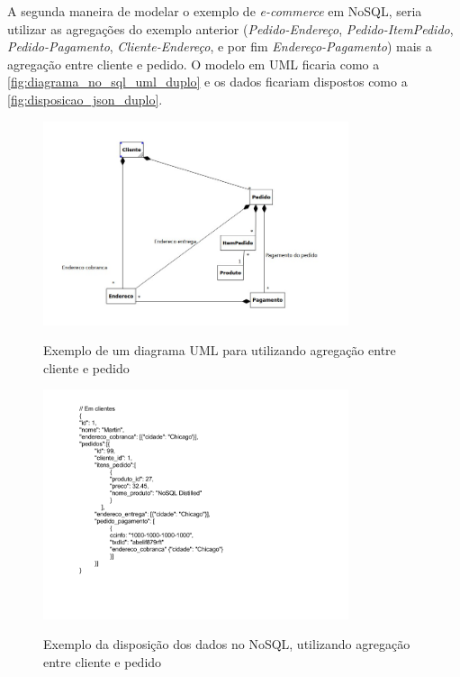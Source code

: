 A segunda maneira de modelar o exemplo de \textit{e-commerce} em NoSQL, seria utilizar as agregações do exemplo anterior (\textit{Pedido-Endereço}, \textit{Pedido-ItemPedido}, \textit{Pedido-Pagamento}, \textit{Cliente-Endereço}, e por fim \textit{Endereço-Pagamento}) mais a agregação entre cliente e pedido. O modelo em \ac{UML} ficaria como a \autoref{fig:diagrama_no_sql_uml_duplo} e os dados ficariam dispostos como a \autoref{fig:disposicao_json_duplo}.

\begin{figure}[H]
    \centering
    \caption{Exemplo de um diagrama \ac{UML} para utilizando agregação entre cliente e pedido}
    \includegraphics[width=0.8\textwidth]{./04-figuras/diagrama_no_sql_uml_duplo.jpg}
    \label{fig:diagrama_no_sql_uml_duplo}
\end{figure}
\begin{figure}[H]
    \centering
    \caption{Exemplo da disposição dos dados no NoSQL, utilizando agregação entre cliente e pedido}
    \includegraphics[width=0.8\textwidth]{./04-figuras/disposicao_json_duplo.png}
    \label{fig:disposicao_json_duplo}
\end{figure}

